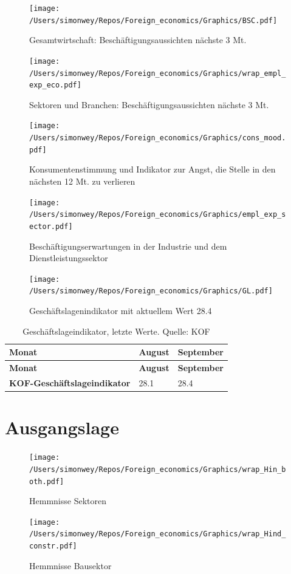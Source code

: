 \documentclass[
]{article}
\begin{document}
\begin{figure}[] \centering
\texttt{[image: /Users/simonwey/Repos/Foreign\_economics/Graphics/BSC.pdf]}
\caption{Gesamtwirtschaft: Beschäftigungsaussichten nächste 3 Mt.} 
\label{Inf_M_W}
\end{figure}

\begin{figure}[] \centering
\texttt{[image: /Users/simonwey/Repos/Foreign\_economics/Graphics/wrap\_empl\_exp\_eco.pdf]}
\caption{Sektoren und Branchen: Beschäftigungsaussichten nächste 3 Mt.} 
\label{Inf_M_W}
\end{figure}

\begin{figure}[] \centering
\texttt{[image: /Users/simonwey/Repos/Foreign\_economics/Graphics/cons\_mood.pdf]}
\caption{Konsumentenstimmung und Indikator zur Angst, die Stelle in den nächsten 12 Mt. zu verlieren} 
\label{Inf_M_W}
\end{figure}

\begin{figure}[] \centering
\texttt{[image: /Users/simonwey/Repos/Foreign\_economics/Graphics/empl\_exp\_sector.pdf]}
\caption{Beschäftigungserwartungen in der Industrie und dem Dienstleistungssektor} 
\label{Inf_M_W}
\end{figure}

\begin{figure}[] \centering
\texttt{[image: /Users/simonwey/Repos/Foreign\_economics/Graphics/GL.pdf]}
\caption{Geschäftslagenindikator mit aktuellem Wert 28.4} 
\label{Inf_M_W}
\end{figure}

\begin{longtable}[]{@{}lll@{}}
\caption{Geschäftslageindikator, letzte Werte. Quelle:
KOF}\tabularnewline
\toprule
\textbf{Monat} & \textbf{August} & \textbf{September} \\
\midrule
\endfirsthead
\toprule
\textbf{Monat} & \textbf{August} & \textbf{September} \\
\midrule
\endhead
\textbf{KOF-Geschäftslageindikator} & 28.1 & 28.4 \\
\bottomrule
\end{longtable}

\hypertarget{ausgangslage}{%
\section{Ausgangslage}\label{ausgangslage}}

\begin{figure}[] \centering
\texttt{[image: /Users/simonwey/Repos/Foreign\_economics/Graphics/wrap\_Hin\_both.pdf]}
\caption{Hemmnisse Sektoren} 
\label{Inf_M_W}
\end{figure}

\begin{figure}[] \centering
\texttt{[image: /Users/simonwey/Repos/Foreign\_economics/Graphics/wrap\_Hind\_constr.pdf]}
\caption{Hemmnisse Bausektor} 
\label{Inf_M_W}
\end{figure}
\end{document}
